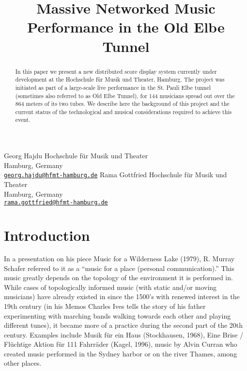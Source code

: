 

\def\papertitle{Massive Networked Music Performance in the Old Elbe Tunnel
}
\def\firstauthor{Georg Hajdu}
\def\secondauthor{Rama Gottfried}

\def\Hochschule{ Hochschule f\"ur Musik und Theater}

\title{\papertitle}
\twoauthors
   {\firstauthor} {	
      Hochschule f\"ur Musik und Theater\\
         Hamburg, Germany \\ %
   \small{\tt \href{mailto:georg.hajdu@hfmt-hamburg.de}{georg.hajdu@hfmt-hamburg.de}}}
    {\secondauthor} {
   Hochschule f\"ur Musik und Theater\\
   Hamburg, Germany \\ %
   \small{\tt \href{mailto:rama.gottfried@hfmt-hamburg.de}{rama.gottfried@hfmt-hamburg.de}}}





%

\capstartfalse
\maketitle
\capstarttrue
%
\begin{abstract}
In this paper we present a new distributed score display system currently under development at the Hochschule f\"ur Musik und Theater, Hamburg.
The project was initiated as part of a large-scale live performance in the St. Pauli Elbe tunnel (sometimes also referred to as Old Elbe Tunnel), for 144 musicians spread out over the 864 meters of its two tubes.
We describe here the background of this project and the current status of the technological and musical considerations required to achieve this event.

\end{abstract}

\section{Introduction}\label{sec:intro}

%
%
%

In a presentation on his piece Music for a Wilderness Lake (1979), R. Murray Schafer referred to it as a ``music for a place (personal communication).'' 
This music greatly depends on the topology of the environment it is performed in. While cases of topologically informed music (with static and/or moving musicians) have already existed in since the 1500’s with renewed interest in the 19th century (in his Memos Charles Ives tells the story of his father experimenting with marching bands walking towards each other and playing different tunes), it became more of a practice during the second part of the 20th century. Examples include Musik f\"ur ein Haus (Stockhausen, 1968), Eine Brise / Fl\"uchtige Aktion f\"ur 111 Fahrr\"ader (Kagel, 1996), music by Alvin Curran who created music performed in the Sydney harbor or on the river Thames, among other places.

